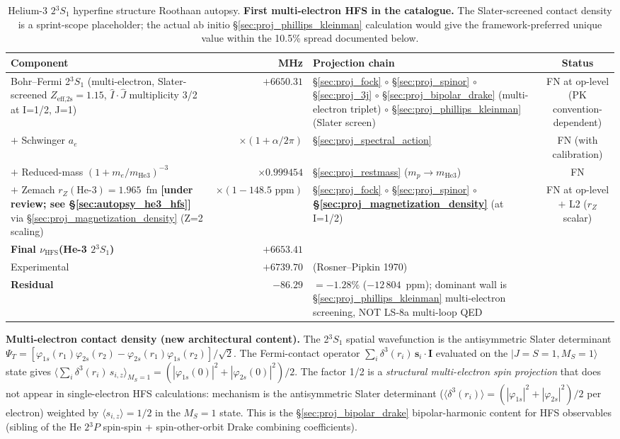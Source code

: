 \documentclass[11pt]{article}
\begin{document}
\begin{table}[h]
\centering\small
\begin{tabular}{p{4.5cm} r p{6cm} c}
\toprule
Component & MHz & Projection chain & Status \\
\midrule
Bohr--Fermi 2$^3\!S_1$ (multi-electron, Slater-screened
$Z_\text{eff,2s}=1.15$, $\hat{I}\!\cdot\!\hat{J}$ multiplicity 3/2
at I=1/2, J=1) & $+6650.31$ &
\S\ref{sec:proj_fock} $\circ$ \S\ref{sec:proj_spinor} $\circ$
\S\ref{sec:proj_3j} $\circ$ \S\ref{sec:proj_bipolar_drake}
(multi-electron triplet) $\circ$
\S\ref{sec:proj_phillips_kleinman} (Slater screen) & FN at op-level
(PK convention-dependent) \\
$+$ Schwinger $a_e$ & $\times(1+\alpha/2\pi)$ &
\S\ref{sec:proj_spectral_action} & FN (with calibration) \\
$+$ Reduced-mass $(1+m_e/m_\text{He3})^{-3}$ & $\times 0.999454$ &
\S\ref{sec:proj_restmass} ($m_p \to m_\text{He3}$) & FN \\
$+$ Zemach $r_Z(\text{He-3})=1.965$~fm \textbf{[under review; see
\S\ref{sec:autopsy_he3_hfs}]} via
\S\ref{sec:proj_magnetization_density} (Z=2 scaling) &
$\times (1-148.5\text{~ppm})$ &
\S\ref{sec:proj_fock} $\circ$ \S\ref{sec:proj_spinor} $\circ$
\textbf{\S\ref{sec:proj_magnetization_density}} (at I=1/2) &
FN at op-level $+$ L2 ($r_Z$ scalar) \\
\midrule
\textbf{Final $\nu_\text{HFS}$(He-3 $2{}^3\!S_1$)} & $+6653.41$ & & \\
Experimental & $+6739.70$ & (Rosner--Pipkin 1970) & \\
\textbf{Residual} & $-86.29$ & $= -1.28\%$ ($-12\,804$~ppm); dominant
wall is \S\ref{sec:proj_phillips_kleinman} multi-electron screening,
NOT LS-8a multi-loop QED & \\
\bottomrule
\end{tabular}
\caption{Helium-3 $2{}^3\!S_1$ hyperfine structure Roothaan autopsy.
\textbf{First multi-electron HFS in the catalogue.} The Slater-screened
contact density is a sprint-scope placeholder; the actual ab initio
\S\ref{sec:proj_phillips_kleinman} calculation would give the
framework-preferred unique value within the 10.5\% spread documented
below.}
\label{tab:autopsy_he3_hfs}
\end{table}

\textbf{Multi-electron contact density (new architectural content).}
The 2$^3\!S_1$ spatial wavefunction is the antisymmetric Slater
determinant $\Psi_T = [\varphi_{1s}(r_1)\varphi_{2s}(r_2) -
\varphi_{2s}(r_1)\varphi_{1s}(r_2)]/\sqrt{2}$. The Fermi-contact
operator $\sum_i \delta^3(r_i)\,\mathbf{s}_i\!\cdot\!\mathbf{I}$
evaluated on the $|J=S=1, M_S=1\rangle$ state gives
$\langle \sum_i \delta^3(r_i)\,s_{i,z}\rangle_{M_S=1} =
(|\varphi_{1s}(0)|^2 + |\varphi_{2s}(0)|^2)/2$. The factor 1/2 is a
\emph{structural multi-electron spin projection} that does not appear
in single-electron HFS calculations: mechanism is the antisymmetric
Slater determinant ($\langle\delta^3(r_i)\rangle =
(|\varphi_{1s}|^2+|\varphi_{2s}|^2)/2$ per electron) weighted by
$\langle s_{i,z}\rangle = 1/2$ in the $M_S=1$ state. This is the
\S\ref{sec:proj_bipolar_drake} bipolar-harmonic content for HFS
observables (sibling of the He $2{}^3\!P$ spin-spin + spin-other-orbit
Drake combining coefficients).
\end{document}
